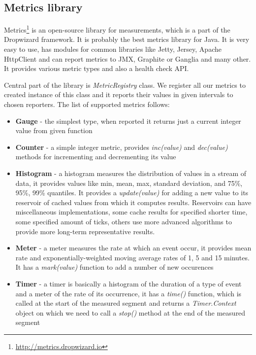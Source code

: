 \documentclass[12pt,oneside]{fithesis2}
\begin{document}
\subsection{Metrics library}

Metrics\footnote{\url{http://metrics.dropwizard.io}} is an open-source library for measurements, which is a part of the Dropwizard framework. It is probably the best metrics library for Java. It is very easy to use, has modules for common libraries like Jetty, Jersey, Apache HttpClient and can report metrics to JMX, Graphite or Ganglia and many other. It provides various metric types and also a health check API.

Central part of the library is \textit{MetricRegistry} class. We register all our metrics to created instance of this class and it reports their values in given intervals to chosen reporters. The list of supported metrics follows\cite{metrics}:

\begin{itemize}
\item \textbf{Gauge} - the simplest type, when reported it returns just a current integer value from given function
\item \textbf{Counter} - a simple integer metric, provides \textit{inc(value)} and \textit{dec(value)} methods for incrementing and decrementing its value
\item \textbf{Histogram} - a histogram measures the distribution of values in a stream of data, it provides values like min, mean, max, standard deviation, and  75\%, 95\%, 99\% quantiles. It provides a \textit{update(value)} for adding a new value to its reservoir of cached values from which it computes results. Reservoirs can have miscellaneous implementations, some cache results for specified shorter time, some specified amount of ticks, others use more advanced algorithms to provide more long-term representative results.
\item \textbf{Meter} - a meter measures the rate at which an event occur, it provides mean rate and exponentially-weighted moving average rates of 1, 5 and 15 minutes. It has a \textit{mark(value)} function to add a number of new occurences
\item \textbf{Timer} - a timer is basically a histogram of the duration of a type of event and a meter of the rate of its occurrence, it has a \textit{time()} function, which is called at the start of the measured segment and returns a \textit{Timer.Context} object on which we need to call a \textit{stop()} method at the end of the measured segment
\end{itemize}
\end{document}
